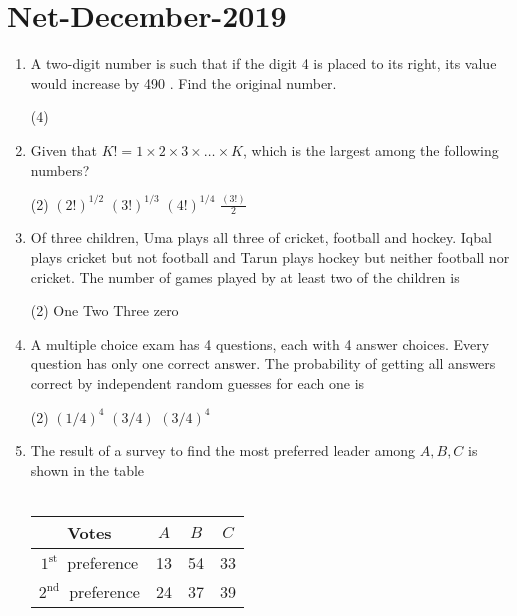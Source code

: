 \chapter{Net-December-2019}
\begin{enumerate}
	\item A two-digit number is such that if the digit 4 is placed to its right, its value would increase by 490 . Find the original number.
	 \begin{tasks}(4)
	\end{tasks}
\item  Given that $K !=1 \times 2 \times 3 \times \ldots \times K$, which is the largest among the following numbers?
	 \begin{tasks}(2)
		\task[\textbf{a.}]$(2 !)^{1 / 2}$
		\task[\textbf{b.}]$(3 !)^{1 / 3}$
		\task[\textbf{c.}] $(4 !)^{1 / 4}$
		\task[\textbf{d.}] $\frac{(3 !)}{2}$
	\end{tasks}
\item  Of three children, Uma plays all three of cricket, football and hockey. Iqbal plays cricket but not football and Tarun plays hockey but neither football nor cricket. The number of games played by at least two of the children is
	 \begin{tasks}(2)
		\task[\textbf{a.}] One
		\task[\textbf{b.}]Two
		\task[\textbf{c.}]Three
		\task[\textbf{d.}]  zero
	\end{tasks}
\item  A multiple choice exam has 4 questions, each with 4 answer choices. Every question has only one correct answer. The probability of getting all answers correct by independent random guesses for each one is
	 \begin{tasks}(2)
		\task[\textbf{b.}]$(1 / 4)^{4}$
		\task[\textbf{c.}] $(3 / 4)$
		\task[\textbf{d.}] $(3 / 4)^{4}$
	\end{tasks}
\item  The result of a survey to find the most preferred leader among $A, B, C$ is shown in the table\\\\
\renewcommand*{\arraystretch}{1.5}
	\begin{tabular}{|c|c|c|c|}
		\hline Votes & $A$ & $B$ & $C$ \\
		\hline $1^{\text {st }}$ preference & 13 & 54 & 33 \\
		\hline $2^{\text {nd }}$ preference & 24 & 37 & 39 \\

\end{tabular}
\end{enumerate}
